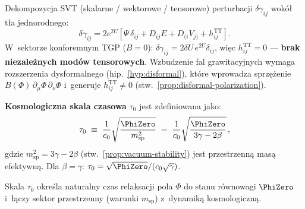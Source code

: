 \begin{remark}%
\label{rem:ADM-tensor-modes}
Dekompozycja SVT (skalarne / wektorowe / tensorowe) perturbacji
$\delta\gamma_{ij}$ wok\'o\l{} t\l{}a jednorodnego:
\begin{equation}
  \delta\gamma_{ij} = 2e^{2U}[\Psi\,\delta_{ij}
  + D_{ij}E + D_{(i}V_{j)} + h_{ij}^{\mathrm{TT}}].
\end{equation}
W~sektorze konforemnym TGP ($B = 0$):
$\delta\gamma_{ij} = 2\delta U\,e^{2U}\delta_{ij}$,
wi\k{e}c $h_{ij}^{\mathrm{TT}} = 0$ ---
\textbf{brak niezale\.znych mod\'ow tensorowych}.
Wzbudzenie fal grawitacyjnych wymaga
rozszerzenia dysformalnego
(hip.~\ref{hyp:disformal}),
kt\'ore wprowadza sprz\k{e}\.zenie
$B(\Phi)\,\partial_\mu\Phi\,\partial_\nu\Phi$
i~generuje $h_{ij}^{\mathrm{TT}} \neq 0$
(stw.~\ref{prop:disformal-polarization}).
\end{remark}

\begin{definition}%
\label{def:tau0}
\textbf{Kosmologiczna skala czasowa} $\tau_0$ jest zdefiniowana jako:
\begin{equation}\label{eq:tau0-def}
  \tau_0 \;\equiv\; \frac{1}{c_0}\sqrt{\frac{\PhiZero}{m_{\mathrm{sp}}^2}}
       \;=\; \frac{1}{c_0}\sqrt{\frac{\PhiZero}{3\gamma - 2\beta}}\,,
\end{equation}
gdzie $m_{\mathrm{sp}}^2 = 3\gamma - 2\beta$
(stw.~\ref{prop:vacuum-stability}) jest przestrzenn\k{a} mas\k{a}
efektywn\k{a}. Dla $\beta = \gamma$:
$\tau_0 = \sqrt{\PhiZero}/(c_0\sqrt{\gamma})$.

Skala $\tau_0$ okre\'sla naturalny czas relaksacji pola $\Phi$
do stanu r\'ownowagi $\PhiZero$ i~\l{}\k{a}czy sektor
przestrzenny (warunki $m_{\mathrm{sp}}$) z~dynamik\k{a}
kosmologiczn\k{a}.
\end{definition}

